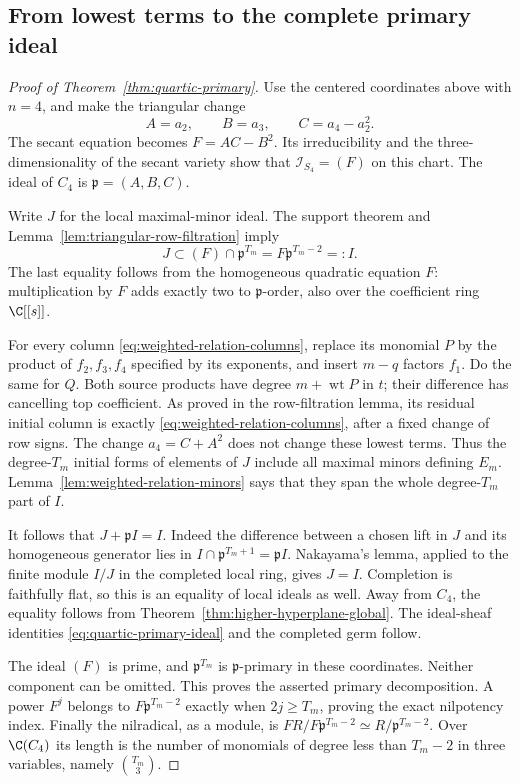 \subsection{From lowest terms to the complete primary ideal}
\begin{proof}[Proof of Theorem~\ref{thm:quartic-primary}]
Use the centered coordinates above with $n=4$, and make the
triangular change
\[
 A=a_2,\qquad B=a_3,\qquad C=a_4-a_2^2.
\]
The secant equation becomes $F=AC-B^2$. Its irreducibility and the
three-dimensionality of the secant variety show that
$\mathcal I_{S_4}=(F)$ on this chart. The ideal of $C_4$ is
$\mathfrak p=(A,B,C)$.

Write $J$ for the local maximal-minor ideal. The support theorem
and Lemma~\ref{lem:triangular-row-filtration} imply
\[
 J\subset (F)\cap\mathfrak p^{T_m}
       =F\mathfrak p^{T_m-2}=:I.
\]
The last equality follows from the homogeneous quadratic equation
$F$: multiplication by $F$ adds exactly two to $\mathfrak p$-order,
also over the coefficient ring $\C[[s]]$.

For every column \eqref{eq:weighted-relation-columns}, replace its
monomial $P$ by the product of $f_2,f_3,f_4$ specified by its
exponents, and insert $m-q$ factors $f_1$. Do the same for $Q$.
Both source products have degree $m+\operatorname{wt}P$ in $t$;
their difference has cancelling top coefficient. As proved in the
row-filtration lemma, its residual initial column is exactly
\eqref{eq:weighted-relation-columns}, after a fixed change of row
signs. The change $a_4=C+A^2$ does not change these lowest terms.
Thus the degree-$T_m$ initial forms of elements of $J$ include all
maximal minors defining $E_m$. Lemma~\ref{lem:weighted-relation-minors}
says that they span the whole degree-$T_m$ part of $I$.

It follows that $J+\mathfrak p I=I$. Indeed the difference between
a chosen lift in $J$ and its homogeneous generator lies in
$I\cap\mathfrak p^{T_m+1}=\mathfrak p I$. Nakayama's lemma,
applied to the finite module $I/J$ in the completed local ring,
gives $J=I$. Completion is faithfully flat, so this is an equality
of local ideals as well. Away from $C_4$, the equality follows from
Theorem~\ref{thm:higher-hyperplane-global}. The ideal-sheaf identities
\eqref{eq:quartic-primary-ideal} and the completed germ follow.

The ideal $(F)$ is prime, and $\mathfrak p^{T_m}$ is
$\mathfrak p$-primary in these coordinates. Neither component can
be omitted. This proves the asserted primary decomposition. A power
$F^j$ belongs to $F\mathfrak p^{T_m-2}$ exactly when
$2j\ge T_m$, proving the exact nilpotency index. Finally the
nilradical, as a module, is
$F R/F\mathfrak p^{T_m-2}\simeq R/\mathfrak p^{T_m-2}$.
Over $\C(C_4)$ its length is the number of monomials of degree
less than $T_m-2$ in three variables, namely $\binom{T_m}{3}$.
\end{proof}

